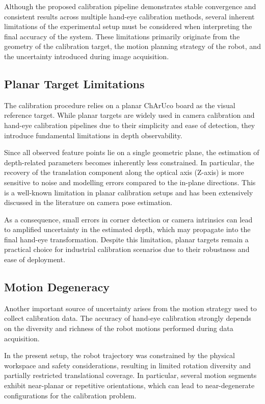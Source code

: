 Although the proposed calibration pipeline demonstrates stable convergence and consistent results across multiple hand-eye calibration methods, several inherent limitations of the experimental setup must be considered when interpreting the final accuracy of the system. These limitations primarily originate from the geometry of the calibration target, the motion planning strategy of the robot, and the uncertainty introduced during image acquisition.

\subsection{Planar Target Limitations}
\label{sec:planar_target_limitations}

The calibration procedure relies on a planar ChArUco board as the visual reference target. While planar targets are widely used in camera calibration and hand-eye calibration pipelines due to their simplicity and ease of detection, they introduce fundamental limitations in depth observability.

Since all observed feature points lie on a single geometric plane, the estimation of depth-related parameters becomes inherently less constrained. In particular, the recovery of the translation component along the optical axis (Z-axis) is more sensitive to noise and modelling errors compared to the in-plane directions. This is a well-known limitation in planar calibration setups and has been extensively discussed in the literature on camera pose estimation.

As a consequence, small errors in corner detection or camera intrinsics can lead to amplified uncertainty in the estimated depth, which may propagate into the final hand-eye transformation. Despite this limitation, planar targets remain a practical choice for industrial calibration scenarios due to their robustness and ease of deployment.

\subsection{Motion Degeneracy}
\label{sec:motion_degeneracy}

Another important source of uncertainty arises from the motion strategy used to collect calibration data. The accuracy of hand-eye calibration strongly depends on the diversity and richness of the robot motions performed during data acquisition.

In the present setup, the robot trajectory was constrained by the physical workspace and safety considerations, resulting in limited rotation diversity and partially restricted translational coverage. In particular, several motion segments exhibit near-planar or repetitive orientations, which can lead to near-degenerate configurations for the calibration problem.

